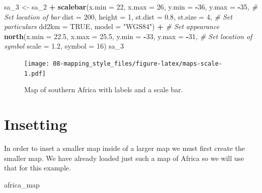 \documentclass[]{book}
\newenvironment{Shaded}{\begin{snugshade}}{\end{snugshade}}
\newcommand{\KeywordTok}[1]{\textcolor[rgb]{0.13,0.29,0.53}{\textbf{#1}}}
\newcommand{\DataTypeTok}[1]{\textcolor[rgb]{0.13,0.29,0.53}{#1}}
\newcommand{\DecValTok}[1]{\textcolor[rgb]{0.00,0.00,0.81}{#1}}
\newcommand{\FloatTok}[1]{\textcolor[rgb]{0.00,0.00,0.81}{#1}}
\newcommand{\StringTok}[1]{\textcolor[rgb]{0.31,0.60,0.02}{#1}}
\newcommand{\CommentTok}[1]{\textcolor[rgb]{0.56,0.35,0.01}{\textit{#1}}}
\newcommand{\OtherTok}[1]{\textcolor[rgb]{0.56,0.35,0.01}{#1}}
\newcommand{\OperatorTok}[1]{\textcolor[rgb]{0.81,0.36,0.00}{\textbf{#1}}}
\newcommand{\NormalTok}[1]{#1}
\theoremstyle{definition}
\theoremstyle{definition}
\theoremstyle{definition}
\theoremstyle{remark}
\begin{document}
\begin{Shaded}
\begin{Highlighting}[]
\NormalTok{sa_}\DecValTok{3}\NormalTok{ <-}\StringTok{ }\NormalTok{sa_}\DecValTok{2} \OperatorTok{+}
\StringTok{  }\KeywordTok{scalebar}\NormalTok{(}\DataTypeTok{x.min =} \DecValTok{22}\NormalTok{, }\DataTypeTok{x.max =} \DecValTok{26}\NormalTok{, }\DataTypeTok{y.min =} \OperatorTok{-}\DecValTok{36}\NormalTok{, }\DataTypeTok{y.max =} \OperatorTok{-}\DecValTok{35}\NormalTok{, }\CommentTok{# Set location of bar}
           \DataTypeTok{dist =} \DecValTok{200}\NormalTok{, }\DataTypeTok{height =} \DecValTok{1}\NormalTok{, }\DataTypeTok{st.dist =} \FloatTok{0.8}\NormalTok{, }\DataTypeTok{st.size =} \DecValTok{4}\NormalTok{, }\CommentTok{# Set particulars}
           \DataTypeTok{dd2km =} \OtherTok{TRUE}\NormalTok{, }\DataTypeTok{model =} \StringTok{"WGS84"}\NormalTok{) }\OperatorTok{+}\StringTok{ }\CommentTok{# Set appearance}
\StringTok{  }\KeywordTok{north}\NormalTok{(}\DataTypeTok{x.min =} \FloatTok{22.5}\NormalTok{, }\DataTypeTok{x.max =} \FloatTok{25.5}\NormalTok{, }\DataTypeTok{y.min =} \OperatorTok{-}\DecValTok{33}\NormalTok{, }\DataTypeTok{y.max =} \OperatorTok{-}\DecValTok{31}\NormalTok{, }\CommentTok{# Set location of symbol}
        \DataTypeTok{scale =} \FloatTok{1.2}\NormalTok{, }\DataTypeTok{symbol =} \DecValTok{16}\NormalTok{)}
\NormalTok{sa_}\DecValTok{3}
\end{Highlighting}
\end{Shaded}

\begin{figure}
\centering
\texttt{[image: 08-mapping\_style\_files/figure-latex/maps-scale-1.pdf]}
\caption{\label{fig:maps-scale}Map of southern Africa with labels and a
scale bar.}
\end{figure}

\section{Insetting}\label{insetting}

In order to inset a smaller map inside of a larger map we must first
create the smaller map. We have already loaded just such a map of Africa
so we will use that for this example.

\begin{Shaded}
\begin{Highlighting}[]
\NormalTok{africa_map}
\end{Highlighting}
\end{Shaded}
\end{document}
